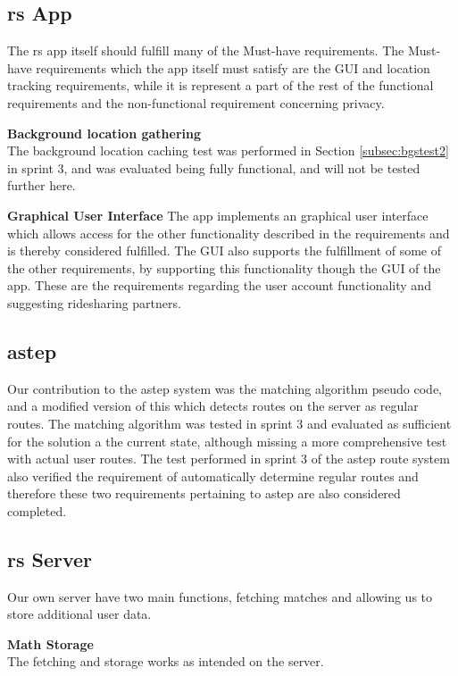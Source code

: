 \subsection{\gls{rs} App}
The \gls{rs} app itself should fulfill many of the Must-have requirements.
The Must-have requirements which the app itself must satisfy are the GUI and location tracking requirements, while it is represent a part of the rest of the functional requirements and the non-functional requirement concerning privacy.

\textbf{Background location gathering}\\
The background location caching test was performed in Section \ref{subsec:bgstest2} in sprint 3, and was evaluated being fully functional, and will not be tested further here.

\textbf{Graphical User Interface}
The app implements an graphical user interface which allows access for the other functionality described in the requirements and is thereby considered fulfilled.
The GUI also supports the fulfillment of some of the other requirements, by supporting this functionality though the GUI of the app.
These are the requirements regarding the user account functionality and suggesting ridesharing partners.

\subsection{\gls{astep}}
Our contribution to the \gls{astep} system was the matching algorithm pseudo code, and a modified version of this which detects routes on the server as regular routes.
The matching algorithm was tested in sprint 3 and evaluated as sufficient for the solution a the current state, although missing a more comprehensive test with actual user routes.
The test performed in sprint 3 of the \gls{astep} route system also verified the requirement of automatically determine regular routes and therefore these two requirements pertaining to \gls{astep} are also considered completed.

\subsection{\gls{rs} Server}
Our own server have two main functions, fetching matches and allowing us to store additional user data.

\textbf{Math Storage}\\
The fetching and storage works as intended on the server. 

